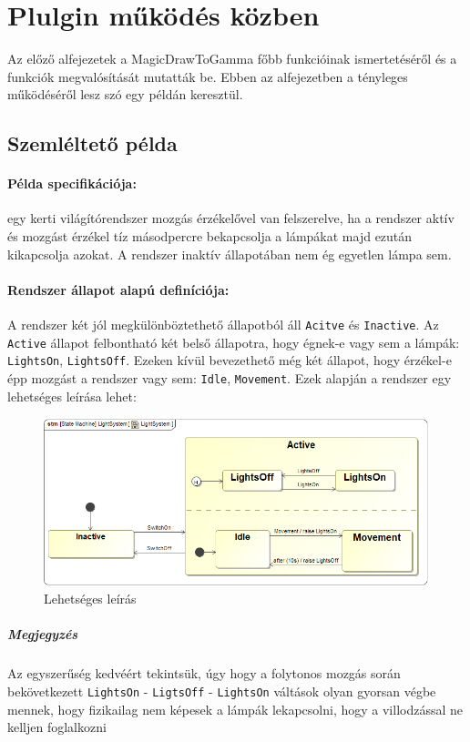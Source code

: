 \section{Plulgin működés közben}

Az előző alfejezetek a MagicDrawToGamma főbb funkcióinak ismertetéséről és a funkciók megvalósítását mutatták be. Ebben az alfejezetben a  tényleges működéséről lesz szó egy példán keresztül.

\subsection{Szemléltető példa}

\paragraph{Példa specifikációja:} egy kerti világítórendszer mozgás érzékelővel van felszerelve, ha a rendszer aktív és mozgást érzékel tíz másodpercre bekapcsolja a lámpákat majd ezután kikapcsolja azokat. A rendszer inaktív állapotában nem ég egyetlen lámpa sem. 

\paragraph{Rendszer állapot alapú definíciója:} A rendszer két jól megkülönböztethető állapotból áll \verb+Acitve+ és \verb+Inactive+. Az \verb+Active+ állapot felbontható két belső állapotra, hogy égnek-e vagy sem a lámpák: \verb+LightsOn+, \verb+LightsOff+. Ezeken kívül bevezethető még két állapot, hogy érzékel-e épp mozgást a rendszer vagy sem: \verb+Idle+, \verb+Movement+. Ezek alapján a rendszer egy lehetséges leírása lehet:
\begin{figure}[H]
	\centering
	\includegraphics[keepaspectratio, width=150mm]{figures/example1.png}
	\caption{Lehetséges leírás}
\end{figure}
\subparagraph{Megjegyzés}Az egyszerűség kedvéért tekintsük, úgy hogy a folytonos mozgás során bekövetkezett \verb+LightsOn+ - \verb+LigtsOff+ - \verb+LightsOn+ váltások olyan gyorsan végbe mennek, hogy fizikailag nem képesek a lámpák lekapcsolni, hogy a villodzással ne kelljen foglalkozni


